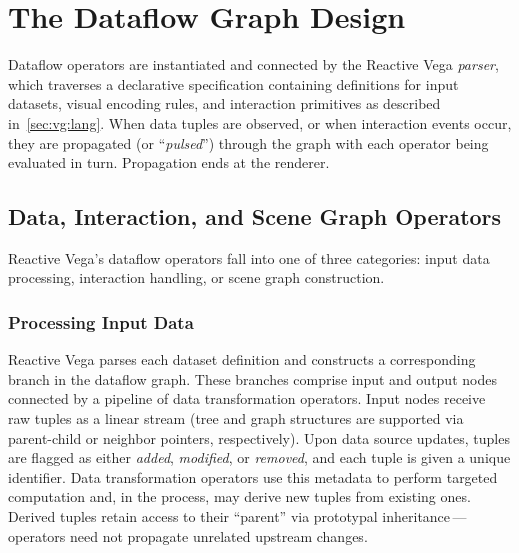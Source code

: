 \section{The Dataflow Graph Design}
\label{sec:vg:dataflow}

\vspace{-10pt}

Dataflow operators are instantiated and connected by the Reactive Vega
\emph{parser}, which traverses a declarative specification containing
definitions for input datasets, visual encoding rules, and interaction
primitives as described in~\cref{sec:vg:lang}. When data tuples are observed, or
when interaction events occur, they are propagated (or ``\emph{pulsed}'')
through the graph with each operator being evaluated in turn. Propagation ends
at the renderer.

\vspace{-10pt}

\subsection{Data, Interaction, and Scene Graph Operators}

\vspace{-7pt}

Reactive Vega's dataflow operators fall into one of three categories: input data
processing, interaction handling, or scene graph construction.

\vspace{-10pt}

\subsubsection{Processing Input Data}

\vspace{-10pt}

Reactive Vega parses each dataset definition and constructs a corresponding
branch in the dataflow graph. These branches comprise input and output nodes
connected by a pipeline of data transformation operators. Input nodes receive
raw tuples as a linear stream (tree and graph structures are supported via
parent-child or neighbor pointers, respectively). Upon data source updates,
tuples are flagged as either \emph{added}, \emph{modified}, or \emph{removed},
and each tuple is given a unique identifier. Data transformation operators use
this metadata to perform targeted computation and, in the process, may derive
new tuples from existing ones. Derived tuples retain access to their ``parent''
via prototypal inheritance\,---\,operators need not propagate unrelated upstream
changes.

